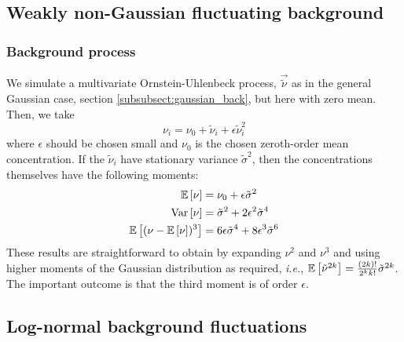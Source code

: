 \subsection{Weakly non-Gaussian fluctuating background}
\label{subsect:weakly_non-gauss_case}

\subsubsection{Background process}
\label{subsubsect:weakly_non-gauss_back}
We simulate a multivariate Ornstein-Uhlenbeck process, $\vec{\tilde{\nu}}$ as in the general Gaussian case, section \ref{subsubsect:gaussian_back}, but here with zero mean. Then, we take
\begin{equation*}
\nu_i = \nu_0 + \tilde{\nu}_i + \epsilon \tilde{\nu}_i^2
\end{equation*}
where $\epsilon$ should be chosen small and $\nu_0$ is the chosen zeroth-order mean concentration. 
If the $\tilde{\nu}_i$ have stationary variance $\tilde{\sigma}^2$, then the concentrations themselves have the following moments:
\begin{align*}
	\mathbb{E}\left[ \nu \right] &= \nu_0 + \epsilon \tilde{\sigma}^2	\\
	\mathrm{Var}\left[ \nu \right] &= \tilde{\sigma}^2 + 2 \epsilon^2 \tilde{\sigma}^4	\\
	\mathbb{E}\left[ (\nu - \mathbb{E}\left[ \nu \right])^3 \right] &= 6 \epsilon \tilde{\sigma}^4 + 8 \epsilon^3 \tilde{\sigma}^6 
\end{align*}
These results are straightforward to obtain by expanding $\nu^2$ and $\nu^3$ and using higher moments of the Gaussian distribution as required, {\it i.e.}, $\mathbb{E}\left[ \tilde{\nu}^{2k} \right] = \frac{(2k)!}{2^k k!} \tilde{\sigma}^{2k}$. The important outcome is that the third moment is of order $\epsilon$. 


\subsection{Log-normal background fluctuations}
\label{subsect:log_normal_case}

